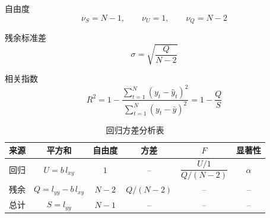 \documentclass[12pt,a4paper]{ctexart}
\begin{document}
自由度
\begin{equation*}
\nu_S=N-1, \qquad \nu_U=1, \qquad \nu_Q=N-2
\end{equation*}

残余标准差
\begin{equation*}
\sigma=\sqrt{\frac{Q}{N-2}}
\end{equation*}

相关指数
\begin{equation*}
R^2=1-\frac{\sum_{t=1}^{N}(y_t-\hat{y}_t)^2}{\sum_{t=1}^{N}(y_t-\bar{y})^2}
=1-\frac{Q}{S}
\end{equation*}

\begin{table}[h]
\centering
\renewcommand{\arraystretch}{1.3}
\caption{回归方差分析表}
\begin{tabular}{cccccc}
\toprule
来源 & 平方和 & 自由度 & 方差 & $F$ & 显著性 \\
\midrule
回归 &
$U=b\,l_{xy}$ &
$1$ &
-- &
$\dfrac{U/1}{Q/(N-2)}$ &
$\alpha$ \\

残余 &
$Q=l_{yy}-b\,l_{xy}$ &
$N-2$ &
$Q/(N-2)$ &
-- &
-- \\
\midrule
总计 &
$S=l_{yy}$ &
$N-1$ &
-- &
-- &
-- \\
\bottomrule
\end{tabular}
\end{table}
\end{document}
